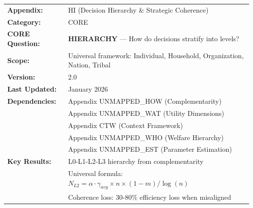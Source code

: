 %
%
%
%
%


\begin{tcolorbox}[colback=green!5!white, colframe=green!75!black,
    title=\textbf{CORE Appendix: Decision Hierarchy \& Strategic Coherence}]

\begin{tabular}{@{}ll@{}}
\textbf{Appendix:} & HI (Decision Hierarchy \& Strategic Coherence) \\
\textbf{Category:} & CORE \\
\textbf{CORE Question:} & \textbf{HIERARCHY} --- How do decisions stratify into levels? \\
\textbf{Scope:} & Universal framework: Individual, Household, Organization, Nation, Tribal \\
\textbf{Version:} & 2.0 \\
\textbf{Last Updated:} & January 2026 \\
\textbf{Dependencies:} & Appendix UNMAPPED_HOW (Complementarity) \\
 & Appendix UNMAPPED_WAT (Utility Dimensions) \\
 & Appendix CTW (Context Framework) \\
 & Appendix UNMAPPED_WHO (Welfare Hierarchy) \\
 & Appendix UNMAPPED_EST (Parameter Estimation) \\
\textbf{Key Results:} & L0-L1-L2-L3 hierarchy from complementarity \\
 & Universal formula: $N_{L2} = \alpha \cdot \gamma_{avg} \times n \times (1-m) / \log(n)$ \\
 & Coherence loss: 30-80\% efficiency loss when misaligned \\
\end{tabular}

\end{tcolorbox}

